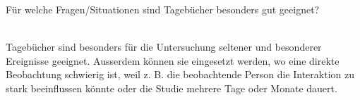 \begin{exercise}
  Für welche Fragen/Situationen sind Tagebücher besonders gut geeignet?
  \\\\
\end{exercise}
Tagebücher sind besonders für die Untersuchung seltener und besonderer Ereignisse geeignet.
Ausserdem können sie eingesetzt werden,
wo eine direkte Beobachtung schwierig ist,
weil z. B. die beobachtende Person die Interaktion zu stark beeinflussen könnte oder die Studie mehrere Tage oder Monate dauert.